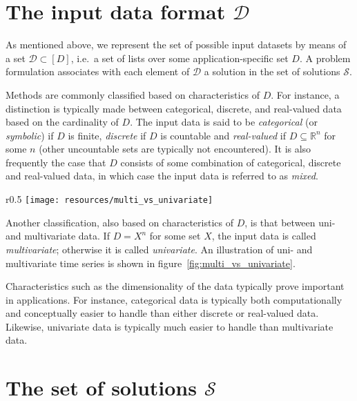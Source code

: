 \section{The input data format $\mathcal{D}$}
\label{sect:data_format}

As mentioned above, we represent the set of possible input datasets by means of a set $\mathcal{D} \subset [D]$, i.e.\ a set of lists over some application-specific set $D$. A problem formulation associates with each element of $\mathcal{D}$ a solution in the set of solutions $\mathcal{S}$.

Methods are commonly classified based on characteristics of $D$. For instance, a distinction is typically made between categorical, discrete, and real-valued data based on the cardinality of $D$. The input data is said to be \emph{categorical} (or \emph{symbolic}) if $D$ is finite, \emph{discrete} if $D$ is countable and \emph{real-valued} if $D \subseteq \mathbb{R}^n$ for some $n$ (other uncountable sets are typically not encountered). It is also frequently the case that $D$ consists of some combination of categorical, discrete and real-valued data, in which case the input data is referred to as \emph{mixed}\cite{TODO}.

\begin{wrapfigure}{r}{0.5\textwidth}
\changecaptionwidth
{}
\texttt{[image: resources/multi\_vs\_univariate]}
\caption[derp]{Two sine curves regarded as two separate univariate time series (dotted lines) and as one multivariate time series (solid lines).}
\label{fig:multi_vs_univariate}
\end{wrapfigure}

Another classification, also based on characteristics of $D$, is that between uni- and multivariate data. If $D = X^n$ for some set $X$, the input data is called \emph{multivariate}; otherwise it is called \emph{univariate}. An illustration of uni- and multivariate time series is shown in figure~\ref{fig:multi_vs_univariate}.

Characteristics such as the dimensionality of the data typically prove important in applications. For instance, categorical data is typically both computationally and conceptually easier to handle than either discrete or real-valued data. Likewise, univariate data is typically much easier to handle than multivariate data.

\section{The set of solutions $\mathcal{S}$}

